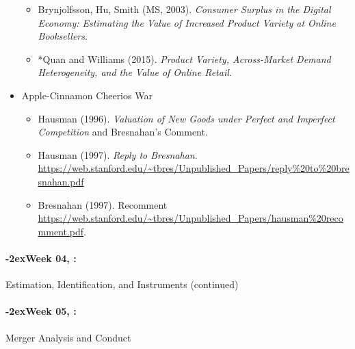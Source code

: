 \documentclass[11pt]{article}
\newcommand{\week}[1]{%
  \paragraph*{\kern-2ex\quad #1, \syldate{\today}:}%
  \AdvanceDate[7]%
}
\begin{document}
\begin{itemize}
\begin{itemize}
\item Brynjolfsson, Hu, Smith (MS, 2003). \textit{Consumer Surplus in the Digital Economy: Estimating the Value of Increased Product Variety at Online Booksellers}.
\item *Quan and Williams (2015). \textit{Product Variety, Across-Market Demand Heterogeneity, and the Value of Online Retail}.
\end{itemize}
\item Apple-Cinnamon Cheerios War
\begin{itemize}
\item Hausman (1996). \textit{Valuation of New Goods under Perfect and Imperfect Competition} and Bresnahan's Comment.
\item Hausman (1997). \textit{Reply to Bresnahan}. \url{https://web.stanford.edu/~tbres/Unpublished_Papers/reply%20to%20bresnahan.pdf}
\item Bresnahan (1997). Recomment \url{https://web.stanford.edu/~tbres/Unpublished_Papers/hausman%20recomment.pdf}.
\end{itemize}
\end{itemize}
\week{Week 04} Estimation, Identification, and Instruments (continued) 
\week{Week 05} Merger Analysis and Conduct 
\end{document}
